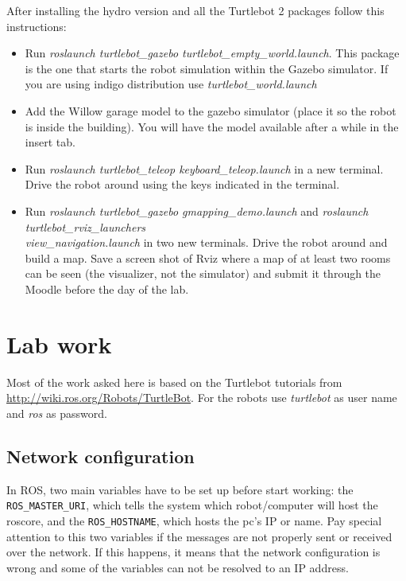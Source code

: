 \documentclass[a4paper,10pt]{article}
\begin{document}
After installing the hydro version and all the Turtlebot 2 packages follow this instructions:
\begin{itemize}
	\item Run \textit{roslaunch turtlebot\_gazebo turtlebot\_empty\_world.launch}. This package is the one that starts the robot simulation within the Gazebo simulator. If you are using indigo distribution use \textit{turtlebot\_world.launch}
	\item Add the Willow garage model to the gazebo simulator (place it so the robot is inside the building). You will have the model available after a while in the insert tab.
	\item Run \textit{roslaunch turtlebot\_teleop keyboard\_teleop.launch} in a new terminal. Drive the robot around using the keys indicated in the terminal.
	\item Run \textit{roslaunch turtlebot\_gazebo gmapping\_demo.launch} and \textit{roslaunch turtlebot\_rviz\_launchers \\ view\_navigation.launch} in two new terminals. Drive the robot around and build a map. Save a screen shot of Rviz where a map of at least two rooms can be seen (the visualizer, not the simulator) and submit it through the Moodle before the day of the lab.
\end{itemize}

\section{Lab work}
Most of the work asked here is based on the Turtlebot tutorials from \url{http://wiki.ros.org/Robots/TurtleBot}. For the robots use \textit{turtlebot} as user name and \textit{ros} as password.

\subsection{Network configuration}
In ROS, two main variables have to be set up before start working: the \texttt{ROS\_MASTER\_URI}, which tells the system which robot/computer will host the roscore, and the \texttt{ROS\_HOSTNAME}, which hosts the pc's IP or name. Pay special attention to this two variables if the messages are not properly sent or received over the network. If this happens, it means that the network configuration is wrong and some of the variables can not be resolved to an IP address.
\end{document}
